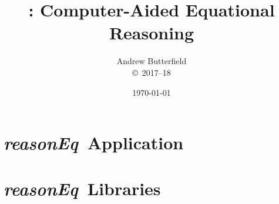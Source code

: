 \documentclass[fleqn,10pt]{report}
\author{
Andrew Butterfield
\\
{\small \copyright\ 2017--18}
}
\title{
  \reasonEq: Computer-Aided Equational Reasoning
}
\date{
\today
}
\def\reasonEq{\textit{\textsf{reasonEq}}}
\begin{document}
\maketitle
\tableofcontents

\chapter{\reasonEq\ Application}



\chapter{\reasonEq\ Libraries}

% 
% 
% 
% 
% 
% 
% 
% 
% 
% 
% 
% 
% 
% 
% 
% 
% 
% 
% 
% 
% 
% 


%
% 
%
%
% 
% 
\newpage

% 
%
% 
% 
%
%
%
% 
\end{document}
